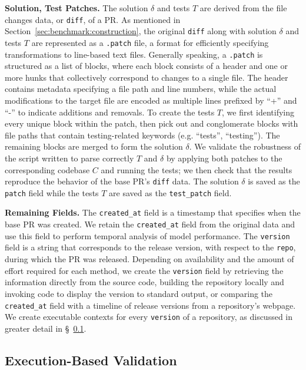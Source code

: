 \textbf{Solution, Test Patches.}
The solution $\delta$ and tests $T$ are derived from the file changes data, or \texttt{diff}, of a PR.
As mentioned in Section~\ref{sec:benchmark:construction}, the original \texttt{diff} along with solution $\delta$ and tests $T$ are represented as a \texttt{.patch} file, a format for efficiently specifying transformations to line-based text files.
Generally speaking, a \texttt{.patch} is structured as a list of blocks, where each block consists of a header and one or more hunks that collectively correspond to changes to a single file.
The header contains metadata specifying a file path and line numbers, while the actual modifications to the target file are encoded as multiple lines prefixed by ``+'' and ``-'' to indicate additions and removals.
To create the tests $T$, we first identifying every unique block within the patch, then pick out and conglomerate blocks with file paths that contain testing-related keywords (e.g. ``tests'', ``testing'').
The remaining blocks are merged to form the solution $\delta$.
We validate the robustness of the script written to parse correctly $T$ and $\delta$ by applying both patches to the corresponding codebase $C$ and running the tests; we then check that the results reproduce the behavior of the base PR's \texttt{diff} data.
The solution $\delta$ is saved as the \texttt{patch} field while the tests $T$ are saved as the \texttt{test\_patch} field.

\textbf{Remaining Fields.} The \texttt{created\_at} field is a timestamp that specifies when the base PR was created.
We retain the \texttt{created\_at} field from the original data and use this field to perform temporal analysis of model performance.
The \texttt{version} field is a string that corresponds to the release version, with respect to the \texttt{repo}, during which the PR was released.
Depending on availability and the amount of effort required for each method, we create the \texttt{version} field by retrieving the information directly from the source code, building the repository locally and invoking code to display the version to standard output, or comparing the \texttt{created\_at} field with a timeline of release versions from a repository's webpage.
We create executable contexts for every \texttt{version} of a repository, as discussed in greater detail in \S~\ref{appx:benchmark:exec-validation}.

\subsection{Execution-Based Validation}
\label{appx:benchmark:exec-validation}

